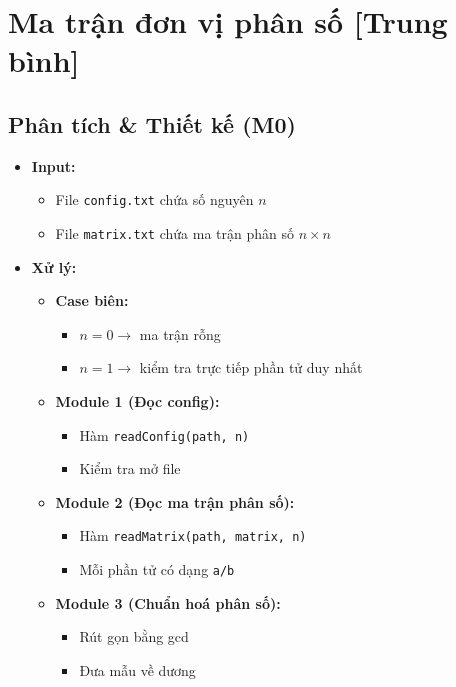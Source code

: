 \section{Ma trận đơn vị phân số [Trung bình]}
\subsection{Phân tích \& Thiết kế (M0)}
\begin{itemize}
    \item \textbf{Input:}
    \begin{itemize}
        \item File \texttt{config.txt} chứa số nguyên $n$
        \item File \texttt{matrix.txt} chứa ma trận phân số $n \times n$
    \end{itemize}

    \item \textbf{Xử lý:}
    \begin{itemize}
        \item \textbf{Case biên:}
        \begin{itemize}
            \item $n = 0 \rightarrow$ ma trận rỗng
            \item $n = 1 \rightarrow$ kiểm tra trực tiếp phần tử duy nhất
        \end{itemize}

        \item \textbf{Module 1 (Đọc config):}
        \begin{itemize}
            \item Hàm \texttt{readConfig(path, n)}
            \item Kiểm tra mở file
        \end{itemize}

        \item \textbf{Module 2 (Đọc ma trận phân số):}
        \begin{itemize}
            \item Hàm \texttt{readMatrix(path, matrix, n)}
            \item Mỗi phần tử có dạng \texttt{a/b}
        \end{itemize}

        \item \textbf{Module 3 (Chuẩn hoá phân số):}
        \begin{itemize}
            \item Rút gọn bằng gcd
            \item Đưa mẫu về dương
        \end{itemize}


\end{itemize}
\end{itemize}

